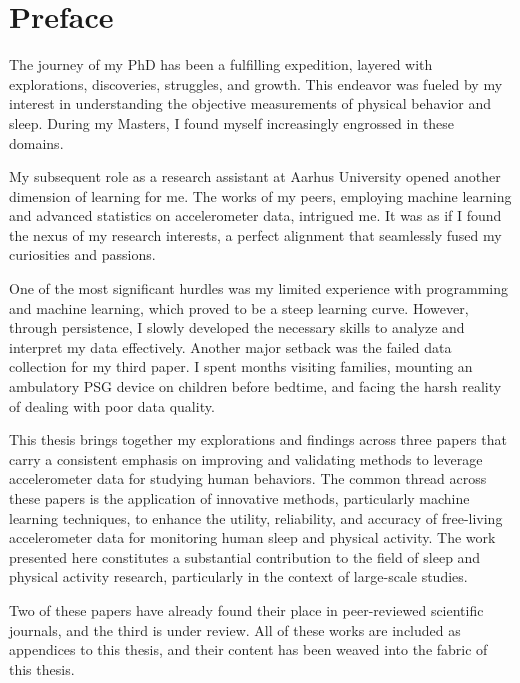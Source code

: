 \documentclass[
  10pt,
  letterpaper,
  DIV=11,
  numbers=noendperiod]{scrartcl}
\author{}
\date{}
\renewcommand*\contentsname{Table of contents}
\newcommand\contentsname{Table of contents}
\begin{document}
\renewcommand*\contentsname{Table of contents}
{
\hypersetup{linkcolor=}
\setcounter{tocdepth}{3}
\tableofcontents
}
\newpage

\hypertarget{preface}{%
\section{Preface}\label{preface}}

The journey of my PhD has been a fulfilling expedition, layered with
explorations, discoveries, struggles, and growth. This endeavor was
fueled by my interest in understanding the objective measurements of
physical behavior and sleep. During my Masters, I found myself
increasingly engrossed in these domains.

My subsequent role as a research assistant at Aarhus University opened
another dimension of learning for me. The works of my peers, employing
machine learning and advanced statistics on accelerometer data,
intrigued me. It was as if I found the nexus of my research interests, a
perfect alignment that seamlessly fused my curiosities and passions.

One of the most significant hurdles was my limited experience with
programming and machine learning, which proved to be a steep learning
curve. However, through persistence, I slowly developed the necessary
skills to analyze and interpret my data effectively. Another major
setback was the failed data collection for my third paper. I spent
months visiting families, mounting an ambulatory PSG device on children
before bedtime, and facing the harsh reality of dealing with poor data
quality.

This thesis brings together my explorations and findings across three
papers that carry a consistent emphasis on improving and validating
methods to leverage accelerometer data for studying human behaviors. The
common thread across these papers is the application of innovative
methods, particularly machine learning techniques, to enhance the
utility, reliability, and accuracy of free-living accelerometer data for
monitoring human sleep and physical activity. The work presented here
constitutes a substantial contribution to the field of sleep and
physical activity research, particularly in the context of large-scale
studies.

Two of these papers have already found their place in peer-reviewed
scientific journals, and the third is under review. All of these works
are included as appendices to this thesis, and their content has been
weaved into the fabric of this thesis.
\end{document}
